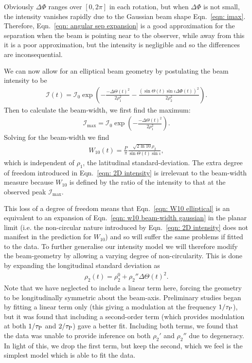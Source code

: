 \documentclass[../full_thesis/full_thesis.tex]{subfiles}
\newcommand{\In}{\mathcal{I}}
\begin{document}
Obviously $\Delta\Phi$ ranges over $[0,2\pi]$ in each rotation, but when
$\Delta\Phi$ is not small, the intensity vanishes rapidly due to the Gaussian
beam shape Eqn.~\eqref{eqn: imax}.  Therefore, Eqn.~\eqref{eqn: angular sep
expansion} is a good approximation for the separation when the beam is pointing
near to the observer, while away from this it is a poor approximation, but the
intensity is negligible and so the differences are inconsequential.

We can now allow for an elliptical beam geometry by postulating the beam
intensity to be
\begin{align}
\In(t) = \In_{0} \exp\left(
-\frac{-\Delta\Theta(t)^{2}}{2\rho_1^{2}}
-\frac{(\sin\Theta(t)\sin\iota\Delta\Phi(t))^{2}}{2\rho_2^{2}}
\right).
\label{eqn: 2D intensity}
\end{align}
Then to calculate the beam-width, we first find the maximum:
\begin{align}
\In_\textrm{max} = \In_{0} \exp\left(
-\frac{-\Delta\Theta(t)^{2}}{2\rho_1^{2}}
\right).
\end{align}
Solving for the beam-width we find
\begin{align}
W_{10}(t) = \frac{P}{\pi}\frac{\sqrt{2\ln10}\rho_{2}}{\sin\Theta(t)\sin\iota},
\label{eqn: W10 elliptical}
\end{align}
which is independent of $\rho_1$, the latitudinal standard-deviation. The extra
degree of freedom introduced in Eqn.~\eqref{eqn: 2D intensity} is irrelevant to
the beam-width measure because $W_{10}$ is defined by the ratio of the
intensity to that at the observed peak $\In_{\textrm{max}}$.

This loss of a degree of freedom means that Eqn.~\eqref{eqn: W10 elliptical} is
an equivalent to an expansion of Eqn.~\eqref{eqn: w10 beam-width gaussian} in
the planar limit (i.e. the non-circular nature introduced by Eqn.~\eqref{eqn: 2D intensity}
does not manifest in the prediction for $W_{10}$)
and so will suffer the same problems if fitted to the data. To further
generalise our intensity model we will therefore modify the beam-geometry by
allowing a varying degree of  non-circularity. This is done by expanding the
longitudinal standard deviation as
\begin{align}
\rho_{2}(t) = \rho_2^{0} + \rho_2'' \Delta\Theta(t)^{2}.
\label{eqn: rho2}
\end{align}
Note that we have neglected to include a linear term here, forcing the geometry
to be longitudinally symmetric about the beam-axis. Preliminary studies began
by fitting a linear term only (this giving a modulation at the frequency
$1/\tau_{\mathrm{P}}$), but it was found that including a second-order term (which provides
modulation at both $1/\tau_{\mathrm{P}}$ and $2/\tau_{\mathrm{P}}$) gave a better fit. Including both
terms, we found that the data was unable to provide inference on both $\rho_2'$
and $\rho_2''$ due to degeneracy. In light of this, we drop the first
term, but keep the second, which we feel is the simplest model which is able to
fit the data.
\end{document}
